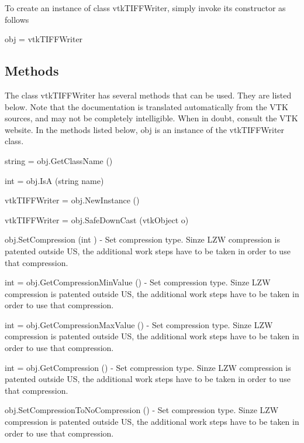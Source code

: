 To create an instance of class vtk\-T\-I\-F\-F\-Writer, simply invoke its constructor as follows \begin{DoxyVerb}  obj = vtkTIFFWriter
\end{DoxyVerb}
 \hypertarget{vtkwidgets_vtkxyplotwidget_Methods}{}\subsection{Methods}\label{vtkwidgets_vtkxyplotwidget_Methods}
The class vtk\-T\-I\-F\-F\-Writer has several methods that can be used. They are listed below. Note that the documentation is translated automatically from the V\-T\-K sources, and may not be completely intelligible. When in doubt, consult the V\-T\-K website. In the methods listed below, {\ttfamily obj} is an instance of the vtk\-T\-I\-F\-F\-Writer class. 
\begin{DoxyItemize}
\item {\ttfamily string = obj.\-Get\-Class\-Name ()}  
\item {\ttfamily int = obj.\-Is\-A (string name)}  
\item {\ttfamily vtk\-T\-I\-F\-F\-Writer = obj.\-New\-Instance ()}  
\item {\ttfamily vtk\-T\-I\-F\-F\-Writer = obj.\-Safe\-Down\-Cast (vtk\-Object o)}  
\item {\ttfamily obj.\-Set\-Compression (int )} -\/ Set compression type. Sinze L\-Z\-W compression is patented outside U\-S, the additional work steps have to be taken in order to use that compression.  
\item {\ttfamily int = obj.\-Get\-Compression\-Min\-Value ()} -\/ Set compression type. Sinze L\-Z\-W compression is patented outside U\-S, the additional work steps have to be taken in order to use that compression.  
\item {\ttfamily int = obj.\-Get\-Compression\-Max\-Value ()} -\/ Set compression type. Sinze L\-Z\-W compression is patented outside U\-S, the additional work steps have to be taken in order to use that compression.  
\item {\ttfamily int = obj.\-Get\-Compression ()} -\/ Set compression type. Sinze L\-Z\-W compression is patented outside U\-S, the additional work steps have to be taken in order to use that compression.  
\item {\ttfamily obj.\-Set\-Compression\-To\-No\-Compression ()} -\/ Set compression type. Sinze L\-Z\-W compression is patented outside U\-S, the additional work steps have to be taken in order to use that compression.  

\end{DoxyItemize}
